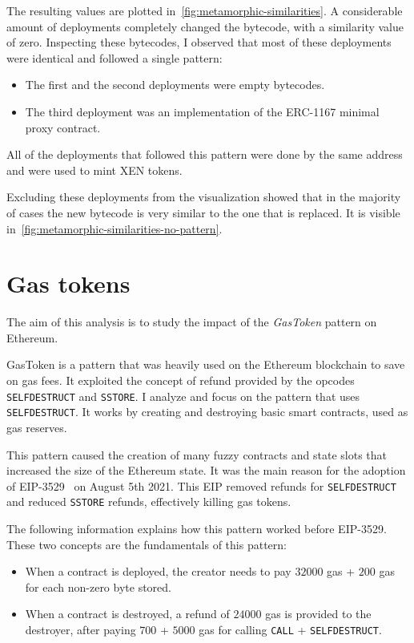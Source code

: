 The resulting values are plotted in~\cref{fig:metamorphic-similarities}. A considerable amount of deployments completely changed the bytecode, with a similarity value of zero. Inspecting these bytecodes, I observed that most of these deployments were identical and followed a single pattern: 

\begin{itemize}
    \item The first and the second deployments were empty bytecodes.
    \item The third deployment was an implementation of the ERC-1167 minimal proxy contract.
\end{itemize}

All of the deployments that followed this pattern were done by the same address and were used to mint XEN tokens.

Excluding these deployments from the visualization showed that in the majority of cases the new bytecode is very similar to the one that is replaced. It is visible in~\cref{fig:metamorphic-similarities-no-pattern}.


\newpage

\section{Gas tokens}
\label{gas-tokens}

The aim of this analysis is to study the impact of the \textit{GasToken} pattern on Ethereum.

GasToken is a pattern that was heavily used on the Ethereum blockchain to save on gas fees. It exploited the concept of refund provided by the opcodes {\tt SELFDESTRUCT} and {\tt SSTORE}. 
I analyze and focus on the pattern that uses {\tt SELFDESTRUCT}. It works by creating and destroying basic smart contracts, used as gas reserves. 

This pattern caused the creation of many fuzzy contracts and state slots that increased the size of the Ethereum state. It was the main reason for the adoption of EIP-3529~\cite{eip-3529} on August 5th 2021. This EIP removed refunds for {\tt SELFDESTRUCT} and reduced {\tt SSTORE} refunds, effectively killing gas tokens. 

The following information explains how this pattern worked before EIP-3529. These two concepts are the fundamentals of this pattern: 

\begin{itemize}
    \item When a contract is deployed, the creator needs to pay $32000$ gas + $200$ gas for each non-zero byte stored.

    \item When a contract is destroyed, a refund of $24000$ gas is provided to the destroyer, after paying $700$ + $5000$ gas for calling {\tt CALL} + {\tt SELFDESTRUCT}. 
\end{itemize}


